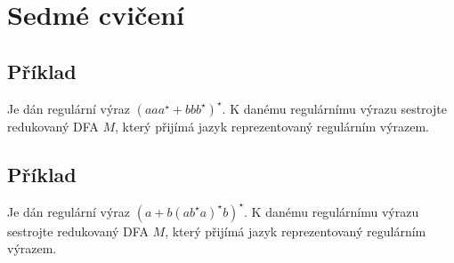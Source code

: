 \section{Sedmé cvičení}

\subsection{Příklad}
Je dán regulární výraz $(aaa^\star + bbb^\star)^\star$. K danému regulárnímu výrazu sestrojte redukovaný DFA $M$, který 
přijímá jazyk reprezentovaný regulárním výrazem.

\subsection{Příklad}
Je dán regulární výraz $(a + b(ab^\star a)^\star b)^\star$. K danému regulárnímu výrazu sestrojte redukovaný DFA $M$, 
který přijímá jazyk reprezentovaný regulárním výrazem.